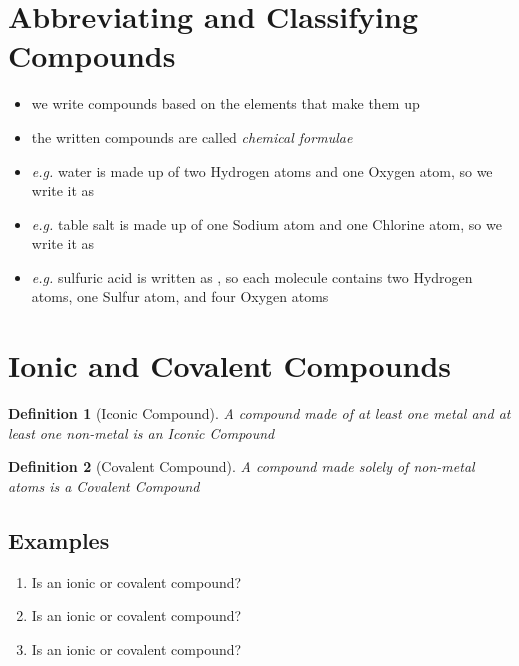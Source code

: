 \documentclass[11pt, oneside]{article}   	%
\newtheorem{definition}{Definition}
\begin{document}
\section{Abbreviating and Classifying Compounds}
\begin{itemize}
\item we write compounds based on the elements that make them up
\item the written compounds are called \emph{chemical formulae}
\item \emph{e.g.} water is made up of two Hydrogen atoms and one Oxygen atom, so we write it as 
\item \emph{e.g.} table salt is made up of one Sodium atom and one Chlorine atom, so we write it as 
\item \emph{e.g.} sulfuric acid is written as , so each molecule contains two Hydrogen atoms, one Sulfur atom, and four Oxygen atoms
\end{itemize}


\section{Ionic and Covalent Compounds}
\begin{definition}[Iconic Compound]
A compound made of at least one metal and at least one non-metal is an \emph{Iconic Compound}
\end{definition}

\begin{definition}[Covalent Compound]
A compound made solely of non-metal atoms is a \emph{Covalent Compound}
\end{definition}

\subsection{Examples}
\begin{enumerate}[label=Example \arabic*]
\item Is  an ionic or covalent compound?
\item Is  an ionic or covalent compound?
\item Is  an ionic or covalent compound?
 \end{enumerate}
\end{document}
